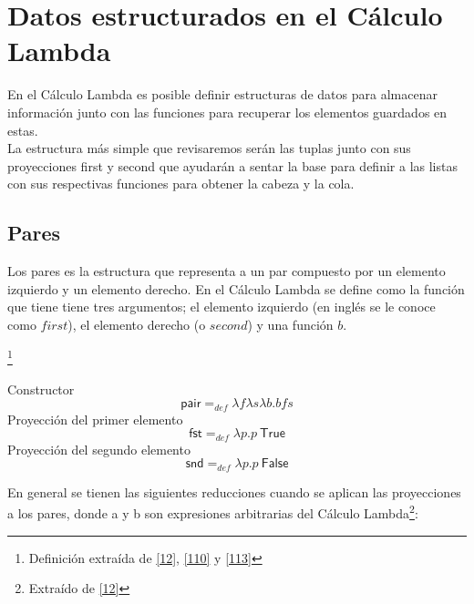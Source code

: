   \section{Datos estructurados en el Cálculo Lambda}

            En el Cálculo Lambda es posible definir estructuras de datos para almacenar información junto con las funciones para recuperar los elementos guardados en estas. \\
	 La estructura más simple que revisaremos serán las tuplas junto con sus proyecciones \textsf{first} y \textsf{second} que ayudarán a sentar la base para definir a las listas con sus respectivas funciones para obtener la cabeza y la cola. 
    
            \subsection{Pares}

                Los pares es la estructura que representa a un par compuesto por un elemento izquierdo y un elemento derecho. En el Cálculo Lambda se define como la función que tiene tiene tres argumentos; el elemento izquierdo (en inglés se le conoce como $first$), el elemento derecho (o $second$) y una función $b$.
        
                \begin{definition}\footnote{Definición extraída de \hyperlink{12}{[12]},  \hyperlink{110}{[110]} y   \hyperlink{113}{[113]}}
            
                    Constructor
                        $$\mathsf{pair} =_{def} \lambda f\lambda s\lambda b. bfs$$
                    Proyección del primer elemento
                        $$\mathsf{fst} =_{def} \lambda p.p \ \textsf{True}$$
                    Proyección del segundo elemento
                        $$\mathsf{snd} =_{def} \lambda p.p \ \textsf{False}$$

                \end{definition}

    En general se tienen las siguientes reducciones cuando se aplican las proyecciones a los pares, donde a y b son expresiones arbitrarias del Cálculo Lambda\footnote{Extraído de \hyperlink{12}{[12]}}:

